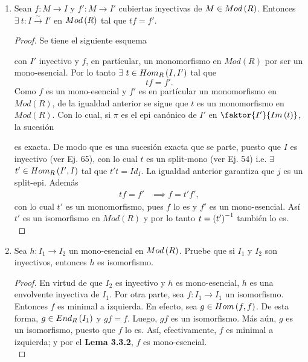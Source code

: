 \documentclass{article}
\begin{document}
\begin{enumerate}[label=\textbf{Ej \arabic*.}]
		\item Sean $f:M\to I$ y $f':M\to I'$ cubiertas inyectivas de $M\in Mod\left(R\right)$. Entonces $\exists\ t:I\overset{\sim}{\to} I'$ en $Mod\left(R\right)$ tal que $tf=f'$.
		\begin{proof}
			Se tiene el siguiente esquema
			\begin{center}
			\end{center}
			con $I'$ inyectivo y $f$, en partícular, un monomorfismo en $Mod(R)$ por ser un mono-esencial. Por lo tanto $\exists\ t\in\functhom{I}{I'}{R}$ tal que \begin{equation*}
				tf=f'.
			\end{equation*} 
			Como $f$ es un mono-esencial y $f'$ es en  partícular un monomorfismo en $Mod(R)$, de la igualdad anterior se sigue que $t$ es un monomorfismo en $Mod(R)$. Con lo cual, si $\pi$ es el epi canónico de $I'$ en $\faktor{I'}{Im\lrprth{t}}$, la sucesión
			\begin{center}
			\end{center}
			es exacta. De modo que es una sucesión exacta que se parte, puesto que $I$ es inyectivo (ver Ej. 65), con lo cual $t$ es un split-mono (ver Ej. 54) i.e. $\exists$ $t'\in\functhom{I'}{I}{R}$ tal que $t't=Id_I$. La igualdad anterior garantiza que $j$ es un split-epi. Además
			\begin{align*}
				tf=f'&\implies f=t'f',
			\end{align*}
			con lo cual $t'$ es un monomorfismo, pues $f$ lo es y $f'$ es un mono-esencial. Así $t'$ es un isomorfismo en $Mod(R)$ y por lo tanto $t=\left(t'\right)^{-1}$ también lo es.\\
		\end{proof}
		
		\item Sea $h:I_{1} \longrightarrow I_{2}$ un mono-esencial en $Mod\left(R\right)$. Pruebe que si $I_{1}$ y $I_{2}$ son inyectivos, entonces $h$ es isomorfismo.
		\begin{proof}
			En virtud de que $I_{2}$ es inyectivo y $h$ es mono-esencial, $h$ es una envolvente inyectiva de $I_{1}$. Por otra parte, sea $f:I_{1} \longrightarrow I_{1}$ un isomorfismo. Entonces $f$ es minimal a izquierda. En efecto, sea $g \in Hom\left(f,f\right)$. De esta forma, $g \in End_{R}\left(I_{1}\right)$ y $gf=f$. Luego, $gf$ es un isomorfismo. Más aún, $g$ es un isomorfismo, puesto que $f$ lo es. Así, efectivamente, $f$ es minimal a izquierda; y por el \textbf{Lema 3.3.2}, $f$ es mono-esencial.\\
		

\end{proof}
\end{enumerate}
\end{document}
